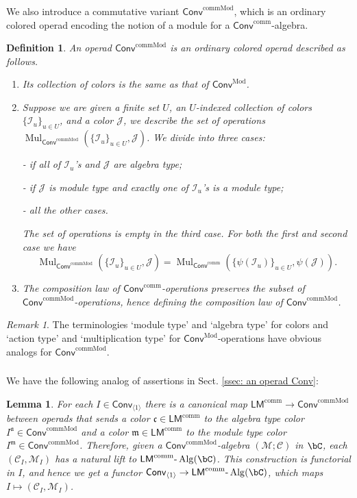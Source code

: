 \documentclass[10pt]{amsart}
\newcommand{\sssec}{\subsubsection}
\newtheorem{lemma}[subsubsection]{Lemma}
\newtheorem{defn}[subsubsection]{Definition}
\theoremstyle{remark}
\newtheorem{rmk}[subsubsection]{Remark}
\newcommand{\mf}[1]{\mathfrak{#1}}
\newcommand{\on}{\operatorname}
\newcommand{\cC}{\mathcal{C}}
\newcommand{\cI}{\mathcal{I}}
\newcommand{\cM}{\mathcal{M}}
\newcommand{\cJ}{\mathcal{J}}
\newcommand{\lAlg}{\text{-}\on{Alg}}
\newcommand{\Mul}{\on{Mul}}
\newcommand{\Conv}{\mathsf{Conv}}
\newcommand{\Convcomm}{\mathsf{Conv}^{\on{comm}}}
\newcommand{\ConvMod}{\mathsf{Conv}^{\on{Mod}}}
\newcommand{\ConvcMod}{\mathsf{Conv}^{\on{commMod}}}
\newcommand{\LMcomm}{\mathsf{LM}^{\on{comm}}}
\begin{document}
\sssec{} 
We also introduce a commutative variant $\ConvcMod$, which is an ordinary colored operad encoding the notion of a module for a $\Convcomm$-algebra.

\begin{defn}
    An operad $\ConvcMod$ is an ordinary colored operad described as follows.
    \begin{enumerate}
        \item Its collection of colors is the same as that of $\ConvMod$.
        \item Suppose we are given a finite set $U$, an $U$-indexed collection of colors $\{\cI_u\}_{u\in U}$, and a color $\cJ$, we describe the set of operations $\Mul_{\ConvcMod}(\{\cI_u\}_{u\in U}, \cJ)$. We divide into three cases:
        
        - if all of $\cI_u$'s and $\cJ$ are algebra type;
    
        - if $\cJ$ is module type and exactly one of $\cI_u$'s is a module type;

        - all the other cases.
        
        The set of operations is empty in the third case. For both the first and second case we have
        \[\Mul_{\ConvcMod}(\{\cI_u\}_{u\in U},\cJ)=\Mul_{\Convcomm}(\{\psi(\cI_u)\}_{u\in U}, \psi(\cJ)).\]
        
        \item The composition law of $\Convcomm$-operations preserves the subset of $\ConvcMod$-operations, hence defining the composition law of $\ConvcMod$.
    \end{enumerate}
\end{defn}
\begin{rmk}
    The terminologies `module type' and `algebra type' for colors and `action type' and `multiplication type' for $\ConvMod$-operations have obvious analogs for $\ConvcMod$.
\end{rmk}

\sssec{}
    We have the following analog of assertions in Sect. \ref{ssec: an operad Conv}:
    
    \begin{lemma}\label{lem: ConvcMod and LMcomm}
    For each $I\in\Conv_{\langle 1\rangle}$ there is a canonical map $\LMcomm\rightarrow \ConvcMod$ between operads that sends a color $\mf{c}\in \LMcomm$ to the algebra type color $I^{\mf{a}}\in\ConvcMod$ and a color $\mf{m}\in\LMcomm$ to the module type color $I^{\mf{m}}\in \ConvcMod$. Therefore, given a $\ConvcMod$-algebra $(\cM;\cC)$ in $\bC$, each $(\cC_I,\cM_I)$ has a natural lift to $\LMcomm\lAlg(\bC)$. This construction is functorial in $I$, and hence we get a functor $\Conv_{\langle 1\rangle}\rightarrow \LMcomm\lAlg(\bC)$, which maps $I\mapsto (\cC_I,\cM_I)$.
\end{lemma}
\end{document}

